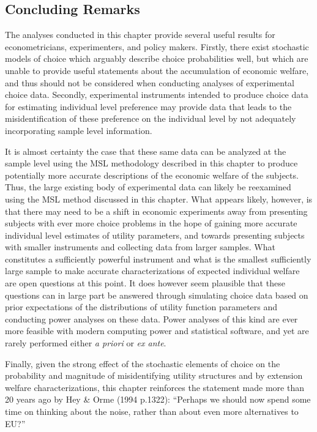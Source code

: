 \documentclass[../main.tex]{subfiles}
\begin{document}
\subsection{Concluding Remarks}

The analyses conducted in this chapter provide several useful results for econometricians, experimenters, and policy makers.
Firstly, there exist stochastic models of choice which arguably describe choice probabilities well, but which are unable to provide useful statements about the accumulation of economic welfare, and thus should not be considered when conducting analyses of experimental choice data.
Secondly, experimental instruments intended to produce choice data for estimating individual level preference may provide data that leads to the misidentification of these preference on the individual level by not adequately incorporating sample level information.

It is almost certainty the case that these same data can be analyzed at the sample level using the MSL methodology described in this chapter to produce potentially more accurate descriptions of the economic welfare of the subjects.
Thus, the large existing body of experimental data can likely be reexamined using the MSL method discussed in this chapter.
What appears likely, however, is that there may need to be a shift in economic experiments away from presenting subjects with ever more choice problems in the hope of gaining more accurate individual level estimates of utility parameters, and towards presenting subjects with smaller instruments and collecting data from larger samples.
What constitutes a sufficiently powerful instrument and what is the smallest sufficiently large sample to make accurate characterizations of expected individual welfare are open questions at this point.
It does however seem plausible that these questions can in large part be answered through simulating choice data based on prior expectations of the distributions of utility function parameters and conducting power analyses on these data.
Power analyses of this kind are ever more feasible with modern computing power and statistical software, and yet are rarely performed either \textit{a priori} or \textit{ex ante}.

Finally, given the strong effect of the stochastic elements of choice on the probability and magnitude of misidentifying utility structures and by extension welfare characterizations, this chapter reinforces the statement made more than 20 years ago by Hey \& Orme (1994 p.1322):
\enquote{Perhaps we should now spend some time on thinking about the noise, rather than about even more alternatives to EU?}
\end{document}
